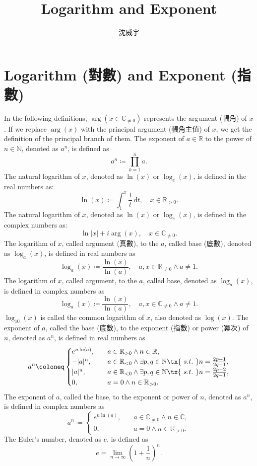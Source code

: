 \documentclass[a4paper,12pt]{article}
\begin{document}
\title{Logarithm and Exponent}
\author{沈威宇}
\date{\temtoday}
\titletocdoc
\section{Logarithm (對數) and Exponent (指數)}
In the following definitions, $\arg(x\in\mathbb{C}_{\neq 0})$ represents the argument (輻角) of $x$. If we replace $\arg(x)$ with the principal argument (輻角主值) of $x$, we get the definition of the principal branch of them.
The exponent of $a\in\mathbb{R}$ to the power of $n\in\mathbb{N}$, denoted as $a^n$, is defined as
\[a^n\coloneq\prod_{k=1}^na.\]
The natural logarithm of $x$, denoted as $\ln(x)$ or $\log_e(x)$, is defined in the real numbers as:
\[\ln(x)\coloneq\int_1^x\frac{1}{t}\,\mathrm{d}t,\quad x\in\mathbb{R}_{>0}.\]
The natural logarithm of $x$, denoted as $\ln(x)$ or $\log_e(x)$, is defined in the complex numbers as:
\[\ln|x|+i\arg(x),\quad x\in\mathbb{C}_{\neq 0}.\]
The logarithm of $x$, called argument (真數), to the $a$, called base (底數), denoted as $\log_a(x)$, is defined in real numbers as
\[\log_a(x)\coloneq\frac{\ln(x)}{\ln(a)},\quad a,x\in\mathbb{R}_{\neq 0}\land a\neq 1.\]
The logarithm of $x$, called argument, to the $a$, called base, denoted as $\log_a(x)$, is defined in complex numbers as
\[\log_a(x)\coloneq\frac{\ln(x)}{\ln(a)},\quad a,x\in\mathbb{C}_{\neq 0}\land a\neq 1.\]
$\log_{10}(x)$ is called the common logarithm of $x$, also denoted as $\log(x)$.
The exponent of $a$, called the base (底數), to the exponent (指數) or power (冪次) of $n$, denoted as $a^n$, is defined in real numbers as
\[a^n\coloneq\begin{cases}
e^{n\ln(a)},\quad & a\in\mathbb{R}_{>0}\land n\in\mathbb{R},\\
-|a|^n,\quad & a\in\mathbb{R}_{<0}\land \exists p,q\in\mathbb{N}\tx{\ s.t.\ } n=\frac{2p-1}{2q-1},\\
|a|^n,\quad & a\in\mathbb{R}_{<0}\land \exists p,q\in\mathbb{N}\tx{\ s.t.\ } n=\frac{2p-2}{2q-1},\\
0,\quad & a=0\land n\in\mathbb{R}_{>0}.
\end{cases}\]
The exponent of $a$, called the base, to the exponent or power of $n$, denoted as $a^n$, is defined in complex numbers as
\[a^n\coloneq\begin{cases}
e^{n\ln(a)},\quad & a\in\mathbb{C}_{\neq 0}\land n\in\mathbb{C},\\
0,\quad & a=0\land n\in\mathbb{R}_{>0}.
\end{cases}\]
The Euler's number, denoted as $e$, is defined as
\[e=\lim_{n\to\infty}\left(1+\frac{1}{n}\right)^n.\]
\end{document}
